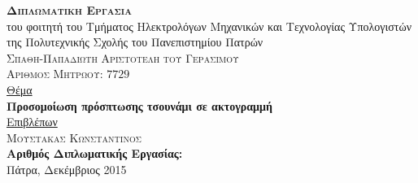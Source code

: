\hfill
{}
\noindent\makebox[\textwidth]{\rule{\textwidth}{0.4pt}}

\large
\vspace{1.5cm}
\begin{center}
  {\huge \textsc{\textbf{Διπλωματικη Εργασια}}}\\[1cm]
  του φοιτητή του Τμήματος Ηλεκτρολόγων Μηχανικών και Τεχνολογίας Υπολογιστών\\
  της Πολυτεχνικής Σχολής του Πανεπιστημίου Πατρών\\[2cm]
  \textsc{\Large Σπαθη-Παπαδιωτη Αριστοτελη του Γερασιμου}\\[10pt]
  \textsc{Αριθμος Μητρωου: $7729$}\\[1.5cm]
  \uline{Θέμα}\\[0.3cm]
  \textbf{\Large Προσομοίωση πρόσπτωσης τσουνάμι σε ακτογραμμή}\\[1.2cm]
  \uline{Επιβλέπων}\\[0.3cm]
  \textsc{\Large Μουστακας Κωνσταντινος}\\[0.8cm]
  \textbf{Αριθμός Διπλωματικής Εργασίας:}\\
  \vfill Πάτρα, Δεκέμβριος 2015
\end{center}
\thispagestyle{empty}

\newpage\null\thispagestyle{empty}\newpage


